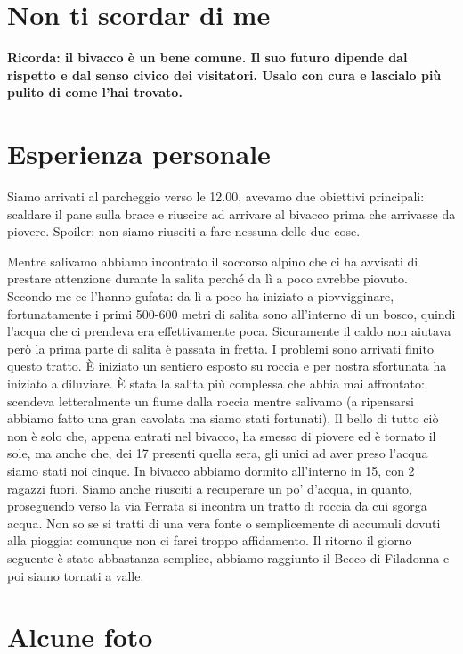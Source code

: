 \documentclass{article}
\begin{document}
\section{Non ti scordar di me}
\textbf{\textcolor{BurntOrange}{Ricorda: il bivacco è un bene comune. Il suo futuro dipende dal rispetto e dal senso civico dei visitatori. Usalo con cura e lascialo più pulito di come l'hai trovato.}}


\section{Esperienza personale}
Siamo arrivati al parcheggio verso le 12.00, avevamo due obiettivi principali: scaldare il pane sulla brace e riuscire ad arrivare al bivacco prima che arrivasse da piovere. Spoiler: non siamo riusciti a fare nessuna delle due cose. 

Mentre salivamo abbiamo incontrato il soccorso alpino che ci ha avvisati di prestare attenzione durante la salita perché da lì a poco avrebbe piovuto. Secondo me ce l'hanno gufata: da lì a poco ha iniziato a piovvigginare, fortunatamente i primi 500-600 metri di salita sono all'interno di un bosco, quindi l'acqua che ci prendeva era effettivamente poca. Sicuramente il caldo non aiutava però la prima parte di salita è passata in fretta. I problemi sono arrivati finito questo tratto. È iniziato un sentiero esposto su roccia e per nostra sfortunata ha iniziato a diluviare. È stata la salita più complessa che abbia mai affrontato: scendeva letteralmente un fiume dalla roccia mentre salivamo (a ripensarsi abbiamo fatto una gran cavolata ma siamo stati fortunati). Il bello di tutto ciò non è solo che, appena entrati nel bivacco, ha smesso di piovere ed è tornato il sole, ma anche che, dei 17 presenti quella sera, gli unici ad aver preso l’acqua siamo stati noi cinque. In bivacco abbiamo dormito all'interno in 15, con 2 ragazzi fuori.
Siamo anche riusciti a recuperare un po' d'acqua, in quanto, proseguendo verso la via Ferrata si incontra un tratto di roccia da cui sgorga acqua. Non so se si tratti di una vera fonte o semplicemente di accumuli dovuti alla pioggia: comunque non ci farei troppo affidamento.
Il ritorno il giorno seguente è stato abbastanza semplice, abbiamo raggiunto il Becco di Filadonna e poi siamo tornati a valle.

\section{Alcune foto}
\end{document}
